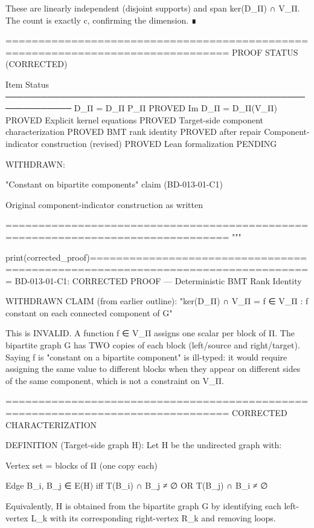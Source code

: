 These are linearly independent (disjoint supports) and span ker(D_Π) ∩ V_Π.
The count is exactly c, confirming the dimension. ∎

================================================================================
PROOF STATUS (CORRECTED)

Item                                          Status
─────────────────────────────────────────────────────────────
D_Π = D_Π P_Π                                 PROVED
Im D_Π = D_Π(V_Π)                             PROVED
Explicit kernel equations                       PROVED
Target-side component characterization          PROVED
BMT rank identity                               PROVED after repair
Component-indicator construction (revised)      PROVED
Lean formalization                              PENDING

WITHDRAWN:

"Constant on bipartite components" claim (BD-013-01-C1)

Original component-indicator construction as written


================================================================================
"""

print(corrected_proof)================================================================================
BD-013-01-C1: CORRECTED PROOF — Deterministic BMT Rank Identity

WITHDRAWN CLAIM (from earlier outline):
"ker(D_Π) ∩ V_Π = {f ∈ V_Π : f constant on each connected component of G}"

This is INVALID. A function f ∈ V_Π assigns one scalar per block of Π.
The bipartite graph G has TWO copies of each block (left/source and right/target).
Saying f is "constant on a bipartite component" is ill-typed: it would require
assigning the same value to different blocks when they appear on different sides
of the same component, which is not a constraint on V_Π.

================================================================================
CORRECTED CHARACTERIZATION

DEFINITION (Target-side graph H):
Let H be the undirected graph with:

Vertex set = blocks of Π (one copy each)

Edge {B_i, B_j} ∈ E(H) iff T(B_i) ∩ B_j ≠ ∅ OR T(B_j) ∩ B_i ≠ ∅


Equivalently, H is obtained from the bipartite graph G by identifying each
left-vertex L_k with its corresponding right-vertex R_k and removing loops.

